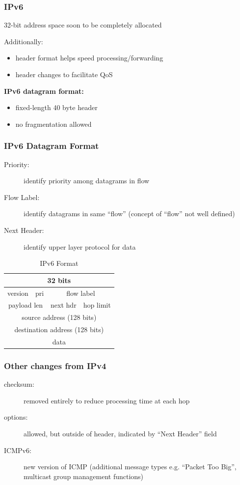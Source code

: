 \subsubsection{IPv6}\label{sec:ipv6}
\begin{leftbar}
	32-bit address space soon to be completely allocated
\end{leftbar}
Additionally:
\begin{itemize}
	\item header format helps speed processing/forwarding
	\item header changes to facilitate QoS
\end{itemize}
\textbf{IPv6 datagram format:}
\begin{itemize}
	\item fixed-length 40 byte header
	\item no fragmentation allowed
\end{itemize}
\subsubsection{IPv6 Datagram Format}
\begin{description}
	\item[Priority:] identify priority among datagrams in flow
	\item[Flow Label:] identify datagrams in same ``flow'' (concept of ``flow'' not well defined)
	\item[Next Header:] identify upper layer protocol for data
\end{description}
\begin{table}[H]
	\centering
	\caption{IPv6 Format}
	\begin{tabular}{cccc}
		\toprule
		\multicolumn{4}{c}{32 bits}\\
		\midrule
		version & pri & \multicolumn{2}{c}{flow label}\\
		\multicolumn{2}{c}{payload len} & next hdr & hop limit\\
		\multicolumn{4}{c}{source address (128 bits)}\\
		\multicolumn{4}{c}{destination address (128 bits)}\\
		\multicolumn{4}{c}{data}\\
		\bottomrule
	\end{tabular}
\end{table}
\subsubsection{Other changes from IPv4}
\begin{description}
	\item[checksum:] removed entirely to reduce processing time at each hop
	\item[options:] allowed, but outside of header, indicated by ``Next Header'' field
	\item[ICMPv6:] new version of ICMP (additional message types e.g. ``Packet Too Big'', multicast group management functions)
\end{description}
